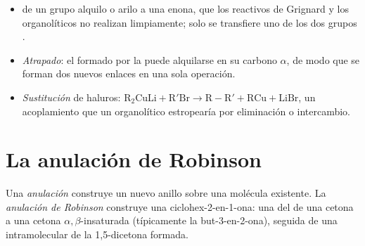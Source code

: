 \begin{itemize}
  \item \emph{} de un grupo alquilo o arilo a una enona, que los reactivos de Grignard y los
        organolíticos no realizan limpiamente; solo se transfiere uno de los dos grupos .
  \item \emph{Atrapado}: el  formado por la  puede alquilarse en su carbono
        $\alpha$, de modo que se forman dos nuevos enlaces  en una sola operación.
  \item \emph{Sustitución} de haluros: $\mathrm{R_2CuLi + R'Br \to R{-}R' + RCu + LiBr}$, un acoplamiento que un
        organolítico estropearía por eliminación o intercambio.
\end{itemize}

\section{La anulación de Robinson}

\begin{definition}[Anulación]\label{def:b2:conjugate-additions:robinson}
Una \emph{anulación} construye un nuevo anillo sobre una molécula existente. La \emph{anulación de Robinson}
 construye una ciclohex-2-en-1-ona: una  del  de una
cetona a una cetona $\alpha,\beta$-insaturada (típicamente la but-3-en-2-ona), seguida de una
 intramolecular de la 1,5-dicetona formada.
\end{definition}


